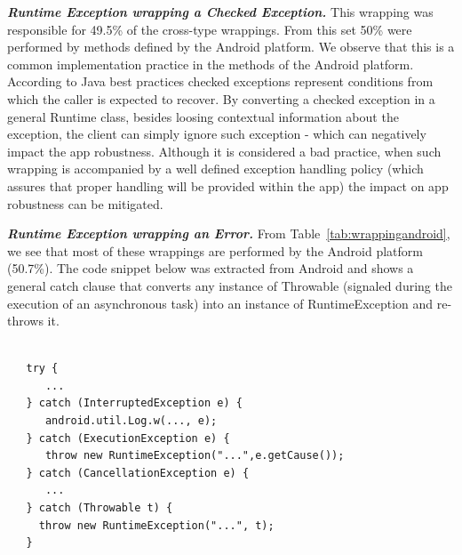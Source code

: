 \emph{\textbf{Runtime Exception wrapping a Checked Exception.}}
This wrapping was responsible for 49.5\% of
the cross-type wrappings.  From this set 50\%  were performed by methods defined by the Android platform.
We observe that this is a common implementation practice in the methods of the Android platform.
According to Java best practices checked exceptions represent conditions from which the caller
is expected to recover. By converting a checked exception in a general Runtime class,
besides loosing contextual information about the exception,
the client can simply ignore such exception - which can negatively impact the app robustness.
Although it is considered a bad practice, when such wrapping is accompanied by a well defined
exception handling policy (which assures that proper handling will be provided within the app)
the impact on app robustness can be mitigated.

\bigskip


\bigskip

\emph{\textbf{Runtime Exception wrapping an Error.}}
From Table~\ref{tab:wrappingandroid}, we see that most of these wrappings
are performed by the Android platform (50.7\%).
The code snippet below was extracted from Android and shows a general catch clause
that converts any instance of Throwable (signaled during the execution
of an asynchronous task) into an instance of RuntimeException and re-throws it.

{\footnotesize
\begin{verbatim}

   try {
      ...
   } catch (InterruptedException e) {
      android.util.Log.w(..., e);
   } catch (ExecutionException e) {
      throw new RuntimeException("...",e.getCause());
   } catch (CancellationException e) {
      ...
   } catch (Throwable t) {
     throw new RuntimeException("...", t);
   }
\end{verbatim}
}


